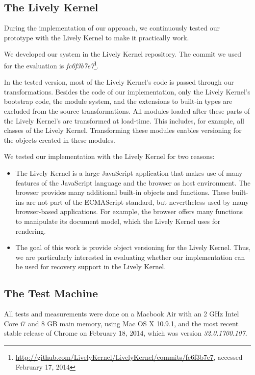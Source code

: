 \subsection{The Lively Kernel}

During the implementation of our approach, we continuously tested our prototype with the Lively Kernel to make it practically work.

We developed our system in the Lively Kernel repository.
The commit we used for the evaluation is \emph{fc6f3b7e7}\footnote{\url{http://github.com/LivelyKernel/LivelyKernel/commits/fc6f3b7e7}, accessed February 17, 2014}.

In the tested version, most of the Lively Kernel's code is passed through our transformations.
Besides the code of our implementation, only the Lively Kernel's bootstrap code, the module system, and the extensions to built-in types are excluded from the source transformations.
All modules loaded after these parts of the Lively Kernel's are transformed at load-time.
This includes, for example, all classes of the Lively Kernel.
Transforming these modules enables versioning for the objects created in these modules.

We tested our implementation with the Lively Kernel for two reasons:

\begin{itemize}
    \item The Lively Kernel is a large JavaScript application that makes use of many features of the JavaScript language and the browser as host environment. The browser provides many additional built-in objects and functions. These built-ins are not part of the ECMAScript standard, but nevertheless used by many browser-based applications. For example, the browser offers many functions to manipulate its document model, which the Lively Kernel uses for rendering.
    \item The goal of this work is provide object versioning for the Lively Kernel. Thus, we are particularly interested in evaluating whether our implementation can be used for recovery support in the Lively Kernel.
\end{itemize}


\subsection{The Test Machine}

All tests and measurements were done on a Macbook Air with an 2 GHz Intel Core i7 and 8 GB main memory, using Mac OS X 10.9.1, and the most recent stable release of Chrome on February 18, 2014, which was version \emph{32.0.1700.107}.

